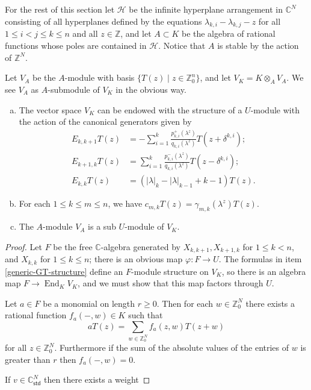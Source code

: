 \documentclass[11pt,fleqn]{article}
\newcommand\CC{\mathbb C}
\newcommand\ZZ{\mathbb Z}
\renewcommand\H{\mathcal H}
\newcommand\ot{\otimes}
\renewcommand\to{\longrightarrow}
\renewcommand\phi{\varphi}
\newcommand\std{\mathsf{std}}
\DeclareMathOperator\End{End}
\begin{document}
For the rest of this section let $\H$ be the infinite hyperplane arrangement 
in $\CC^N$ consisting of all hyperplanes defined by the equations 
$\lambda_{k,i} - \lambda_{k,j} - z$ for all $1 \leq i < j \leq k \leq n$ and 
all $z \in \ZZ$, and let $A \subset K$ be the algebra of rational functions 
whose poles are contained in $\H$. Notice that $A$ is stable by the action of
$\ZZ^N$.


\begin{Proposition}
Let $V_A$ be the $A$-module with basis $\{T(z) \mid z \in \ZZ^n_0\}$, and let 
$V_K = K \ot_A V_A$. We see $V_A$ as $A$-submodule of $V_K$ in the obvious way.

\begin{enumerate}[(a)]
\item \label{generic-GT-structure}
The vector space $V_K$ can be endowed with the structure of a $U$-module 
with the action of the canonical generators given by
\begin{align*}
E_{k,k+1} T(z) 
	&= - \sum_{i=1}^k \frac{p^+_{k,i}(\lambda^z)}{q_{k,i}(\lambda^z)} 
		T(z + \delta^{k,i}); \\
E_{k+1,k} T(z) 
	&= \sum_{i=1}^k \frac{p^-_{k,i}(\lambda^z)}{q_{k,i}(\lambda^z)} 
		T(z - \delta^{k,i}); \\
E_{k,k} T(z)
	&= (|\lambda|_k - |\lambda|_{k-1} + k -1) T(z).
\end{align*}

\item For each $1 \leq k \leq m \leq n$, we have $c_{m,k} T(z) = 
\gamma_{m,k}(\lambda^z) T(z)$.

\item The $A$-module $V_A$ is a sub $U$-module of $V_K$.
\end{enumerate}
\end{Proposition}

\begin{proof}
Let $F$ be the free $\CC$-algebra generated by $X_{k,k+1}, X_{k+1,k}$ for 
$1 \leq k < n$, and $X_{k,k}$ for $1 \leq k \leq n$; there is an obvious map
$\phi: F \to U$. The formulas in item \ref{generic-GT-structure} define an 
$F$-module structure on $V_K$, so there is an algebra map $F \to \End_K V_K$, 
and we must show that this map factors through $U$.

Let $a \in F$ be a monomial on length $r \geq 0$. Then for each $w \in \ZZ^N_0$
there exists a rational function $f_a(-,w) \in K$ such that
\[
	aT(z) = \sum_{w \in \ZZ^N_0} f_a(z,w) T(z+w)
\]
for all $z \in \ZZ^N_0$. Furthermore if the sum of the absolute values of the
entries of $w$ is greater than $r$ then $f_a(-,w) = 0$.

If $v \in \CC^N_\std$ then there exists a weight 
\end{proof}
\end{document}

